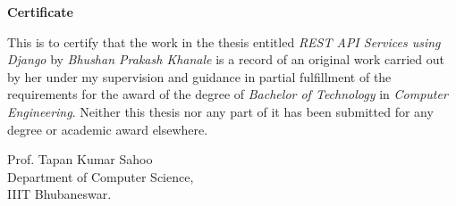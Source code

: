 \centerline{\Large{\bf Certificate}}
\vspace{1cm}

\noindent This is to certify that the work in the thesis entitled
{\it REST API Services using Django } by {\it Bhushan Prakash Khanale}
is a record of an original work carried out by her under my
supervision and guidance in partial fulfillment of the requirements for
the award of the degree of \textit{Bachelor of Technology} in
\textit{Computer Engineering}. Neither this thesis nor any part of
it has been submitted for any degree or academic award elsewhere.

\vspace*{1in}
\begin{flushright} 
Prof. Tapan Kumar Sahoo\\
Department of Computer Science,\\
IIIT Bhubaneswar.
\end{flushright}
